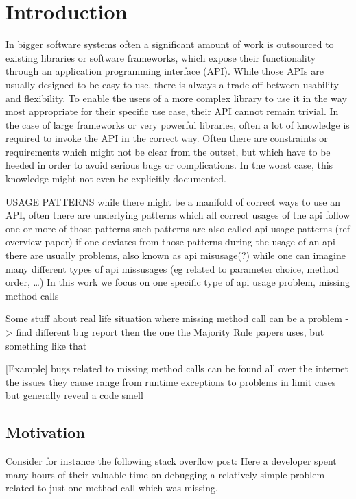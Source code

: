 \chapter{Introduction}\label{chapter:introduction}

In bigger software systems often a significant amount of work is outsourced to existing libraries or software frameworks, which expose their functionality through an application programming interface (API).
While those APIs are usually designed to be easy to use, there is always a trade-off between usability and flexibility.
To enable the users of a more complex library to use it in the way most appropriate for their specific use case, their API cannot remain trivial.
In the case of large frameworks or very powerful libraries, often a lot of knowledge is required to invoke the API in the correct way.
Often there are constraints or requirements which might not be clear from the outset, but which have to be heeded in order to avoid serious bugs or complications.
In the worst case, this knowledge might not even be explicitly documented.

USAGE PATTERNS
while there might be a manifold of correct ways to use an API, often there are underlying patterns which 
all correct usages of the api follow one or more of those patterns
such patterns are also called api usage patterns (ref overview paper)
if one deviates from those patterns during the usage of an api there are usually problems, also known as api misusage(?)
while one can imagine many different types of api missusages (eg related to parameter choice, method order, \ldots)
In this work we focus on one specific type of api usage problem, missing method calls

Some stuff about real life situation where missing method call can be a problem
-> find different bug report then the one the Majority Rule papers uses, but something like that

[Example]
bugs related to missing method calls can be found all over the internet
the issues they cause range from runtime exceptions to problems in limit cases
but generally reveal a code smell

\section{Motivation}

Consider for instance the following stack overflow post:
Here a developer spent many hours of their valuable time on debugging a relatively simple problem related to just one method call which was missing.

